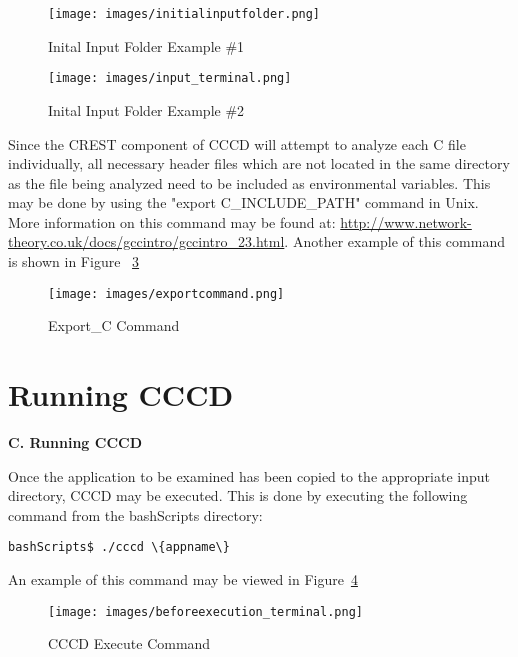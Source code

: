 \documentclass[conference]{IEEEtran}
\begin{document}
\begin{figure}[t!]
\centering
\texttt{[image: images/initialinputfolder.png]}
\caption{Inital Input Folder Example \#1}
\label{fig:initialimportfolder}
\end{figure}


\begin{figure}[t!]
\centering
\texttt{[image: images/input\_terminal.png]}
\caption{Inital Input Folder Example \#2}
\label{fig:initialimportfolder_terminal}
\end{figure}


Since the CREST component of CCCD will attempt to analyze each C file individually, all necessary header files which are not located in the same directory as the file being analyzed need to be included as environmental variables. This may be 
done by using the "export C\_INCLUDE\_PATH" command in Unix. More information on this command may be found at:
\url{http://www.network-theory.co.uk/docs/gccintro/gccintro_23.html}. Another example of this command is shown in Figure ~\ref{fig:exportcommand} \\



\begin{figure}[t!]
\centering
\texttt{[image: images/exportcommand.png]}
\caption{Export\_C Command}
\label{fig:exportcommand}
\end{figure}



\section{Running CCCD}
{\bf C. Running CCCD} %


Once the application to be examined has been copied to the appropriate input directory, CCCD may be executed. This is done by executing the following command from the bashScripts directory:
\begin{lstlisting}
bashScripts$ ./cccd \{appname\}
\end{lstlisting}

An example of this command may be viewed in Figure~\ref{fig:executecommand} 



\begin{figure}[t!]
\centering
\texttt{[image: images/beforeexecution\_terminal.png]}
\caption{CCCD Execute Command}
\label{fig:executecommand}
\end{figure}
\end{document}
